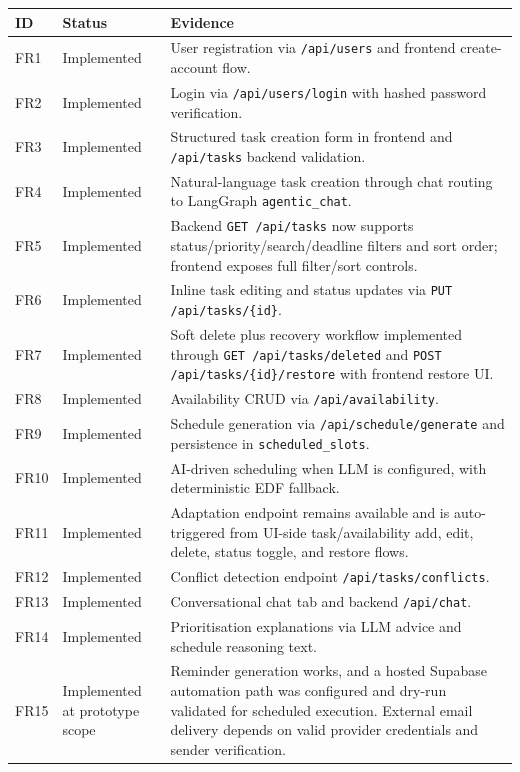 \documentclass[12pt]{article}
\begin{document}
\begin{table}[h!]
\centering
\scriptsize
\begin{tabular}{|l|p{2.3cm}|p{8.0cm}|}
\hline
\textbf{ID} & \textbf{Status} & \textbf{Evidence} \\
\hline
FR1 & Implemented & User registration via \texttt{/api/users} and frontend create-account flow. \\
\hline
FR2 & Implemented & Login via \texttt{/api/users/login} with hashed password verification. \\
\hline
FR3 & Implemented & Structured task creation form in frontend and \texttt{/api/tasks} backend validation. \\
\hline
FR4 & Implemented & Natural-language task creation through chat routing to LangGraph \texttt{agentic\_chat}. \\
\hline
FR5 & Implemented & Backend \texttt{GET /api/tasks} now supports status/priority/search/deadline filters and sort order; frontend exposes full filter/sort controls. \\
\hline
FR6 & Implemented & Inline task editing and status updates via \texttt{PUT /api/tasks/\{id\}}. \\
\hline
FR7 & Implemented & Soft delete plus recovery workflow implemented through \texttt{GET /api/tasks/deleted} and \texttt{POST /api/tasks/\{id\}/restore} with frontend restore UI. \\
\hline
FR8 & Implemented & Availability CRUD via \texttt{/api/availability}. \\
\hline
FR9 & Implemented & Schedule generation via \texttt{/api/schedule/generate} and persistence in \texttt{scheduled\_slots}. \\
\hline
FR10 & Implemented & AI-driven scheduling when LLM is configured, with deterministic EDF fallback. \\
\hline
FR11 & Implemented & Adaptation endpoint remains available and is auto-triggered from UI-side task/availability add, edit, delete, status toggle, and restore flows. \\
\hline
FR12 & Implemented & Conflict detection endpoint \texttt{/api/tasks/conflicts}. \\
\hline
FR13 & Implemented & Conversational chat tab and backend \texttt{/api/chat}. \\
\hline
FR14 & Implemented & Prioritisation explanations via LLM advice and schedule reasoning text. \\
\hline
FR15 & Implemented at prototype scope & Reminder generation works, and a hosted Supabase automation path was configured and dry-run validated for scheduled execution. External email delivery depends on valid provider credentials and sender verification. \\

\end{tabular}
\end{table}
\end{document}
